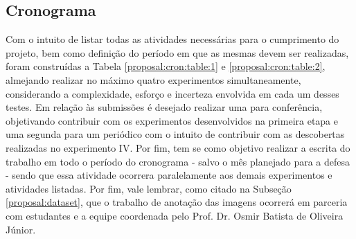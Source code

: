 \subsection{Cronograma}
\label{proposal:cron}
Com o intuito de listar todas as atividades necessárias para o cumprimento do projeto, bem como definição do período em que as mesmas devem ser realizadas, foram construídas a Tabela \ref{proposal:cron:table:1} e \ref{proposal:cron:table:2}, almejando realizar no máximo quatro  experimentos simultaneamente, considerando a complexidade, esforço e incerteza envolvida em cada um desses testes. Em relação às submissões é desejado realizar uma para conferência, objetivando  contribuir com os experimentos desenvolvidos na primeira etapa e uma segunda para um periódico com o intuito de contribuir com as descobertas realizadas no experimento IV. Por fim, tem se como objetivo realizar a escrita do trabalho em todo o período do cronograma - salvo o mês planejado para a defesa - sendo que essa atividade ocorrera paralelamente aos demais experimentos e atividades listadas. Por fim, vale lembrar, como citado na Subseção \ref{proposal:dataset}, que o trabalho de anotação das imagens ocorrerá em parceria com estudantes e a equipe coordenada pelo Prof. Dr. Osmir Batista de Oliveira Júnior. 



